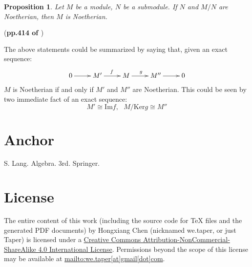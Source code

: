 \documentclass{article}
\numberwithin{equation}{subsection} %
\newtheorem{prop}{Proposition}[section]
\theoremstyle{definition}
\begin{document}
\begin{prop}
    Let $M$ be a module, $N$ be a submodule. If $N$ and $M/N$ are
    Noetherian, then $M$ is Noetherian.
\end{prop}
(\textbf{pp.414 of \cite{lang}})

The above statements could be summarized by saying that, given an
exact sequence:
\begin{align*}
    \xymatrix{
    0\ar[r] & M'\ar[r]^f & M\ar[r]^g & M''\ar[r] & 0
    }
\end{align*}
$M$ is Noetherian if and only if $M'$ and $M''$ are Noetherian.
This could be seen by two immediate fact of an exact sequence:
\[
    M'\cong \text{Im}f, \text{ } M/\text{Ker}g \cong M''
\]
\printnomenclature

\section{Anchor}
\begin{thebibliography}{1}
     S. Lang. Algebra. 3rd. Springer.
\end{thebibliography}
\section{License}
The entire content of this work (including the source code
for TeX files and the generated PDF documents) by 
Hongxiang Chen (nicknamed we.taper, or just Taper) is
licensed under a 
\href{http://creativecommons.org/licenses/by-nc-sa/4.0/}{Creative 
Commons Attribution-NonCommercial-ShareAlike 4.0 International 
License}. Permissions beyond the scope of this 
license may be available at \url{mailto:we.taper[at]gmail[dot]com}.
\end{document}
